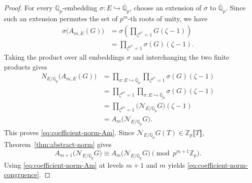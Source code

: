 \documentclass[11pt,table]{amsart}
\numberwithin{equation}{section}
\begin{document}
\begin{proof}
For every $\mathbb Q_p$-embedding
$\sigma:E\hookrightarrow\overline{\mathbb Q}_p$, choose an extension of
$\sigma$ to $\overline{\mathbb Q}_p$.  Since such an extension permutes
the set of $p^m$-th roots of unity, we have
\[
\begin{aligned}
        \sigma\bigl(A_{m,E}(G)\bigr)
        &=
        \sigma\left(
        \prod_{\zeta^{p^m}=1}G(\zeta-1)
        \right)\\
        &=
        \prod_{\zeta^{p^m}=1}
        \sigma(G)(\zeta-1).
\end{aligned}
\]
Taking the product over all embeddings $\sigma$ and interchanging the
two finite products gives
\[
\begin{aligned}
        N_{E/\mathbb Q_p}\bigl(A_{m,E}(G)\bigr)
        &=
        \prod_{\sigma:E\hookrightarrow\overline{\mathbb Q}_p}
        \prod_{\zeta^{p^m}=1}
        \sigma(G)(\zeta-1)\\
        &=
        \prod_{\zeta^{p^m}=1}
        \prod_{\sigma:E\hookrightarrow\overline{\mathbb Q}_p}
        \sigma(G)(\zeta-1)\\
        &=
        \prod_{\zeta^{p^m}=1}
        \bigl(\mathcal N_{E/\mathbb Q_p}G\bigr)(\zeta-1)\\
        &=
        A_m\bigl(\mathcal N_{E/\mathbb Q_p}G\bigr).
\end{aligned}
\]
This proves \eqref{eq:coefficient-norm-Am}.  Since
$\mathcal N_{E/\mathbb Q_p}G(T)\in\mathbb Z_p\llbracket T\rrbracket$,
Theorem~\ref{thm:abstract-norm} gives
\[
        A_{m+1}\bigl(\mathcal N_{E/\mathbb Q_p}G\bigr)
        \equiv
        A_m\bigl(\mathcal N_{E/\mathbb Q_p}G\bigr)
        \pmod{p^{m+1}\mathbb Z_p}.
\]
Using \eqref{eq:coefficient-norm-Am} at levels $m+1$ and $m$ yields
\eqref{eq:coefficient-norm-congruence}.
\end{proof}
\end{document}
